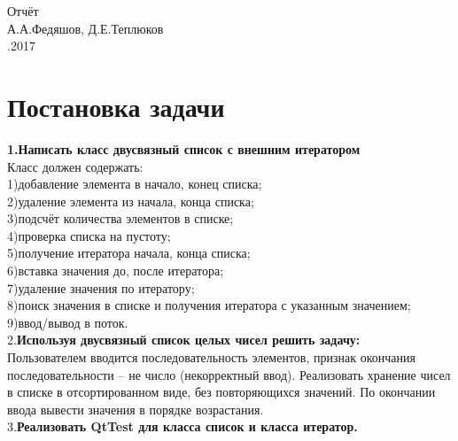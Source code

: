 \documentclass[a4paper]{article}
\begin{document}
	
	\begin{center}
		\hfill \break
		\hfill \break
		\hfill \break
		\hfill \break
		\hfill \break
		\hfill \break
		\hfill \break
		\hfill \break
		\hfill \break
		\hfill\break
		\hfill \break
		\hfill \break
		\hfill \break
		\hfill \break
		\hfill \break
		\hfill \break
		\hfill \break
		{\LARGE Отчёт} \\
		\hfill \break
		А.А.Федяшов, Д.Е.Теплюков\\
		\hfill {}.2017\\
		\hfill \break
		\hfill \break
	\end{center}
	
	
	\thispagestyle{empty} %
	
\newpage

\newpage
	{\section{Постановка задачи}
	\hfill\break
	{\bf 
	1.Написать класс двусвязный список с внешним итератором\\}
	Класс должен содержать:\\
	1)добавление элемента в начало, конец списка;\\
	2)удаление элемента из начала, конца списка;\\
	3)подсчёт количества элементов в списке;\\
	4)проверка списка на пустоту;\\
	5)получение итератора начала, конца списка;\\
	6)вставка значения до, после итератора;\\
	7)удаление значения по итератору;\\
	8)поиск значения в списке и получения итератора с указанным значением;\\
	9)ввод/вывод в поток.\\
	2.{\bf Используя двусвязный список целых чисел решить задачу:}\\
	Пользователем вводится последовательность элементов, признак окончания последовательности – не число (некорректный ввод). Реализовать хранение чисел в 
	списке в отсортированном виде, без повторяющихся значений. По окончании ввода вывести значения в порядке возрастания.\\
	3.{\bf Реализовать QtTest для класса список и класса итератор.}\\
}
        
\end{document}
